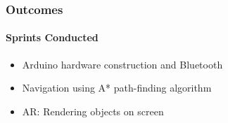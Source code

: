 \frametitle{Outcomes}

\framesubtitle{Sprints Conducted}
\begin{itemize}
	\item Arduino hardware construction and Bluetooth
	\item Navigation using A* path-finding algorithm
	\item AR: Rendering objects on screen
\end{itemize}